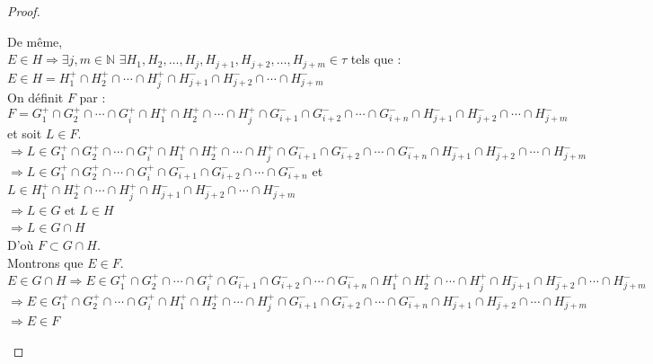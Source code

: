 \documentclass[11pt]{report}
\theoremstyle{styletheorem}
\theoremstyle{styledef}
\theoremstyle{remark}
\begin{document}
\begin{proof}
\begin{enumerate}
		De même, \\ $E \in H \Rightarrow  \exists j,m \in \mathbb{N}$ $\exists H_1, H_2, \dots,H_j,H_{j+1},H_{j+2}, \dots,H_{j+m} \in \tau $ tels que : \\  $E \in H =  H_1^+ \cap H_2^+ \cap \cdots \cap H_j^+ \cap H_{j+1}^- \cap H_{j+2}^- \cap \cdots \cap H_{j+m}^- $\\
		On définit $F$ par : 
		$$F = G_1^+ \cap G_2^+ \cap \cdots \cap G_i^+ \cap  H_1^+ \cap H_2^+ \cap \cdots \cap H_j^+ \cap G_{i+1}^- \cap G_{i+2}^- \cap \cdots \cap G_{i+n}^- \cap H_{j+1}^- \cap H_{j+2}^- \cap \cdots \cap H_{j+m}^-  $$
		et soit $L \in F$.\\
		$\Rightarrow L \in  G_1^+ \cap G_2^+ \cap \cdots \cap G_i^+ \cap  H_1^+ \cap H_2^+ \cap \cdots \cap H_j^+ \cap G_{i+1}^- \cap G_{i+2}^- \cap \cdots \cap G_{i+n}^- \cap H_{j+1}^- \cap H_{j+2}^- \cap \cdots \cap H_{j+m}^- $\\
		$\Rightarrow L \in  G_1^+ \cap G_2^+ \cap \cdots \cap G_i^+ \cap G_{i+1}^- \cap G_{i+2}^- \cap \cdots \cap G_{i+n}^-$ et $L \in H_1^+ \cap H_2^+ \cap \cdots \cap H_j^+ \cap H_{j+1}^- \cap H_{j+2}^- \cap \cdots \cap H_{j+m}^- $\\
		$\Rightarrow L \in G \text{ et } L \in H$\\
		$\Rightarrow L \in G \cap H$\\
		D'où $F \subset G \cap H$.\\ Montrons que $E \in F$.\\
		$E \in G \cap H \Rightarrow E \in  G_1^+ \cap G_2^+ \cap \cdots \cap G_i^+ \cap G_{i+1}^- \cap G_{i+2}^- \cap \cdots \cap G_{i+n}^- \cap  H_1^+ \cap H_2^+ \cap \cdots \cap H_j^+ \cap H_{j+1}^- \cap H_{j+2}^- \cap \cdots \cap H_{j+m}^- $\\
		$\Rightarrow E \in G_1^+ \cap G_2^+ \cap \cdots \cap G_i^+ \cap  H_1^+ \cap H_2^+ \cap \cdots \cap H_j^+ \cap G_{i+1}^- \cap G_{i+2}^- \cap \cdots \cap G_{i+n}^- \cap H_{j+1}^- \cap H_{j+2}^- \cap \cdots \cap H_{j+m}^-  $\\
		$\Rightarrow E \in F$\\
		

\end{enumerate}
\end{proof}
\end{document}
